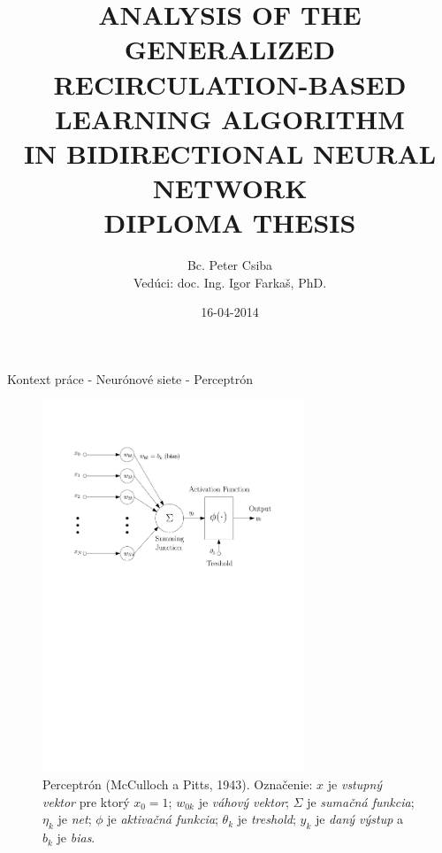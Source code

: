 \documentclass[xcolor=dvipsnames]{beamer}
\title[ANALYSIS OF A LEARNING ALGORITHM IN BIDIRECTIONAL NEURAL NETWORK]{
ANALYSIS OF THE GENERALIZED \\
RECIRCULATION-BASED LEARNING ALGORITHM \\
IN BIDIRECTIONAL NEURAL NETWORK \\
\vspace{3cm}
DIPLOMA THESIS
}
\author[P. Csiba]{Bc. Peter Csiba \\ Vedúci: doc. Ing. Igor Farkaš, PhD.}
\institute[FMFI UK]{
  UNIVERZITA KOMENSKÉHO V BRATISLAVE\\
  FAKULTA MATEMATIKY, FYZIKY A INFORMATIKY
}
\date{16-04-2014}
\begin{document}
\begin{frame}[plain]
  \titlepage
\end{frame}



\begin{frame}{Kontext práce - Neurónové siete - Perceptrón}
 
\begin{figure}[h]
  \centering
  \includegraphics[width=0.7\textwidth]{img/perceptron.pdf}    
  \caption{Perceptrón (McCulloch a Pitts, 1943). Označenie: $x$ je \emph{vstupný vektor} pre ktorý $x_0=1$; $w_{0k}$ je \emph{váhový vektor}; $\Sigma$ je \emph{sumačná funkcia}; $\eta_k$ je \emph{net}; $\phi$ je \emph{aktivačná funkcia}; $\theta_k$ je \emph{treshold}; $y_k$ je \emph{daný výstup} a $b_k$ je \emph{bias}.} 
  \label{fig:perceptron}
\end{figure} 

\end{frame}
\end{document}
